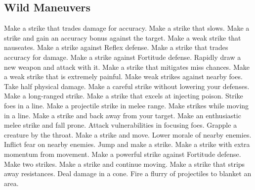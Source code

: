 \small
\subsection{Wild Maneuvers}\label{Wild Maneuvers}
\begin{spelllist}
 Make a strike that trades damage for accuracy.
 Make a strike that slows.
 Make a strike and gain an accuracy bonus against the target.
 Make a weak strike that nauseates.
 Make a strike against Reflex defense.
 Make a strike that trades accuracy for damage.
 Make a strike against Fortitude defense.
 Rapidly draw a new weapon and attack with it.
 Make a strike that mitigates miss chances.
 Make a weak strike that is extremely painful.
 Make weak strikes against nearby foes.
 Take half physical damage.
 Make a careful strike without lowering your defenses.
 Make a long-ranged strike.
 Make a strike that excels at injecting poison.
 Strike foes in a line.
 Make a projectile strike in melee range.
 Make strikes while moving in a line.
 Make a strike and back away from your target.
 Make an enthusiastic melee strike and fall prone.
 Attack vulnerabilities in focusing foes.
 Grapple a creature by the throat.
 Make a strike and move.
 Lower morale of nearby enemies.
 Inflict fear on nearby enemies.
 Jump and make a strike.
 Make a strike with extra momentum from movement.
 Make a powerful strike against Fortitude defense.
 Make two strikes.
 Make a strike and continue moving.
 Make a strike that strips away resistances.
 Deal damage in a cone.
 Fire a flurry of projectiles to blanket an area.

\end{spelllist}
